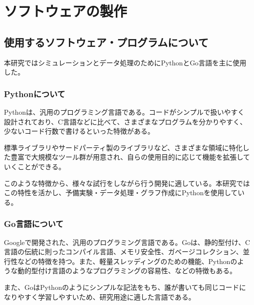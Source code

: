 \hypertarget{ux30bdux30d5ux30c8ux30a6ux30a7ux30a2ux306eux88fdux4f5c}{%
\section{ソフトウェアの製作}\label{ux30bdux30d5ux30c8ux30a6ux30a7ux30a2ux306eux88fdux4f5c}}

\hypertarget{ux4f7fux7528ux3059ux308bux30bdux30d5ux30c8ux30a6ux30a7ux30a2ux30d7ux30edux30b0ux30e9ux30e0ux306bux3064ux3044ux3066}{%
\subsection{使用するソフトウェア・プログラムについて}\label{ux4f7fux7528ux3059ux308bux30bdux30d5ux30c8ux30a6ux30a7ux30a2ux30d7ux30edux30b0ux30e9ux30e0ux306bux3064ux3044ux3066}}

本研究ではシミュレーションとデータ処理のためにPythonとGo言語を主に使用した。

\hypertarget{pythonux306bux3064ux3044ux3066}{%
\subsubsection{Pythonについて}\label{pythonux306bux3064ux3044ux3066}}

Pythonは、汎用のプログラミング言語である。コードがシンプルで扱いやすく設計されており、C言語などに比べて、さまざまなプログラムを分かりやすく、少ないコード行数で書けるといった特徴がある。

標準ライブラリやサードパーティ製のライブラリなど、さまざまな領域に特化した豊富で大規模なツール群が用意され、自らの使用目的に応じて機能を拡張していくことができる。

このような特徴から、様々な試行をしながら行う開発に適している。本研究ではこの特性を活かし、予備実験・データ処理・グラフ作成にPythonを使用している。

\hypertarget{goux8a00ux8a9eux306bux3064ux3044ux3066}{%
\subsubsection{Go言語について}\label{goux8a00ux8a9eux306bux3064ux3044ux3066}}

Googleで開発された、汎用のプログラミング言語である。Goは、静的型付け、C言語の伝統に則ったコンパイル言語、メモリ安全性、ガベージコレクション、並行性などの特徴を持つ。また、軽量スレッディングのための機能、Pythonのような動的型付け言語のようなプログラミングの容易性、などの特徴もある。

また、GoはPythonのようにシンプルな記法をもち、誰が書いても同じコードになりやすく学習しやすいため、研究用途に適した言語である。

